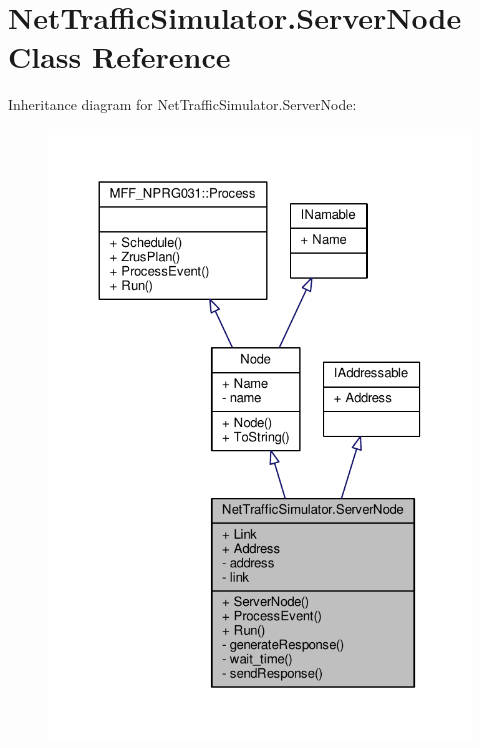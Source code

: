 \hypertarget{classNetTrafficSimulator_1_1ServerNode}{\section{Net\-Traffic\-Simulator.\-Server\-Node Class Reference}
\label{classNetTrafficSimulator_1_1ServerNode}
}


Inheritance diagram for Net\-Traffic\-Simulator.\-Server\-Node\-:\nopagebreak
\begin{figure}[H]
\begin{center}
\leavevmode
\includegraphics[width=326pt]{classNetTrafficSimulator_1_1ServerNode__inherit__graph}
\end{center}
\end{figure}



